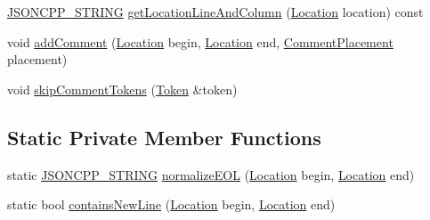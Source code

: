 \begin{DoxyCompactItemize}
\item 
\hyperlink{json_8h_a1e723f95759de062585bc4a8fd3fa4be_a1e723f95759de062585bc4a8fd3fa4be}{J\+S\+O\+N\+C\+P\+P\+\_\+\+S\+T\+R\+I\+NG} \hyperlink{classJson_1_1OurReader_ac129e94cdc260822b2fd24e2ca35e636_ac129e94cdc260822b2fd24e2ca35e636}{get\+Location\+Line\+And\+Column} (\hyperlink{classJson_1_1OurReader_a1bdc7bbc52ba87cae6b19746f2ee0189_a1bdc7bbc52ba87cae6b19746f2ee0189}{Location} location) const
\item 
void \hyperlink{classJson_1_1OurReader_ad7318c37469a9106069a236fb4b10e1f_ad7318c37469a9106069a236fb4b10e1f}{add\+Comment} (\hyperlink{classJson_1_1OurReader_a1bdc7bbc52ba87cae6b19746f2ee0189_a1bdc7bbc52ba87cae6b19746f2ee0189}{Location} begin, \hyperlink{classJson_1_1OurReader_a1bdc7bbc52ba87cae6b19746f2ee0189_a1bdc7bbc52ba87cae6b19746f2ee0189}{Location} end, \hyperlink{namespaceJson_a4fc417c23905b2ae9e2c47d197a45351_a4fc417c23905b2ae9e2c47d197a45351}{Comment\+Placement} placement)
\item 
void \hyperlink{classJson_1_1OurReader_a856dea44d92578c276856d7a65a4ebdc_a856dea44d92578c276856d7a65a4ebdc}{skip\+Comment\+Tokens} (\hyperlink{classJson_1_1OurReader_1_1Token}{Token} \&token)
\end{DoxyCompactItemize}
\subsection*{Static Private Member Functions}
\begin{DoxyCompactItemize}
\item 
static \hyperlink{json_8h_a1e723f95759de062585bc4a8fd3fa4be_a1e723f95759de062585bc4a8fd3fa4be}{J\+S\+O\+N\+C\+P\+P\+\_\+\+S\+T\+R\+I\+NG} \hyperlink{classJson_1_1OurReader_a73ec369ee36598e008b80e36263691be_a73ec369ee36598e008b80e36263691be}{normalize\+E\+OL} (\hyperlink{classJson_1_1OurReader_a1bdc7bbc52ba87cae6b19746f2ee0189_a1bdc7bbc52ba87cae6b19746f2ee0189}{Location} begin, \hyperlink{classJson_1_1OurReader_a1bdc7bbc52ba87cae6b19746f2ee0189_a1bdc7bbc52ba87cae6b19746f2ee0189}{Location} end)
\item 
static bool \hyperlink{classJson_1_1OurReader_ab9e83f5a3d9dab2dabce367a4faa2b1b_ab9e83f5a3d9dab2dabce367a4faa2b1b}{contains\+New\+Line} (\hyperlink{classJson_1_1OurReader_a1bdc7bbc52ba87cae6b19746f2ee0189_a1bdc7bbc52ba87cae6b19746f2ee0189}{Location} begin, \hyperlink{classJson_1_1OurReader_a1bdc7bbc52ba87cae6b19746f2ee0189_a1bdc7bbc52ba87cae6b19746f2ee0189}{Location} end)
\end{DoxyCompactItemize}
